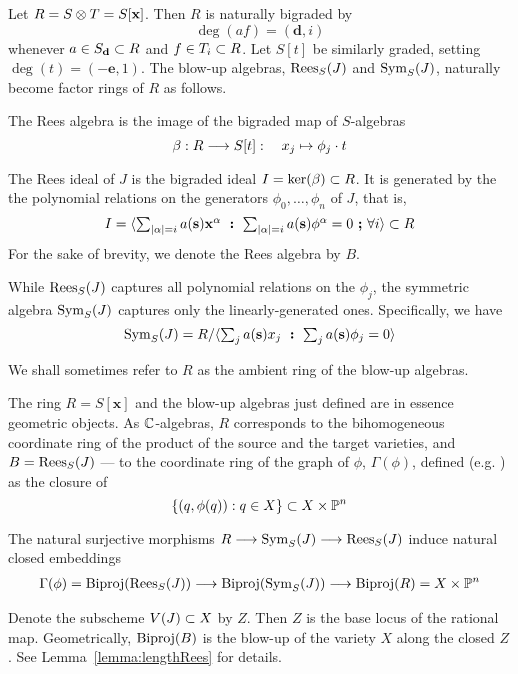 \documentclass[fleqn,reqno]{amsart}
\begin{document}
\begin{paragraf}
\label{par:blowup-algebras}
Let $R=S\otimes T=S[\mathbf x]$. Then $R$ is naturally bigraded by
\[
	\deg(af)=(\mathbf d,i)
\]
whenever $a\in S_{\mathbf d}\subset R$ and $f\in T_i\subset R$.
Let $S[t]$ be similarly graded, setting $\deg(t)=(-\mathbf e,1)$.
The blow-up algebras, $\operatorname{Rees}_S(J)$ and $\operatorname{Sym}_S(J)$, naturally become
factor rings of $R$ as follows.

The Rees algebra is the image of the bigraded map of $S$-algebras
\[
	\beta:R\longrightarrow S[t]:\quad x_j\mapsto\phi_j\cdot t
\]

The Rees ideal of $J$ is the bigraded ideal $I=\ker(\beta)\subset R$.
It is generated by the the polynomial relations on the generators $\phi_0,\ldots,\phi_n$ of $J$,
that is,
\[
	I=\langle \textstyle\sum_{|\alpha|=i} a(\mathbf s){\mathbf x}^{\alpha}
	~\boldsymbol:~
	\textstyle\sum_{|\alpha|=i} a(\mathbf s){\mathbf \phi}^{\alpha}=0
	~\boldsymbol;~\forall i\rangle\subset R
\]
For the sake of brevity, we denote the Rees algebra by $B$.

While $\operatorname{Rees}_S(J)$ captures all polynomial relations on the $\phi_j$,
the symmetric algebra $\operatorname{Sym}_S(J)$ captures only the linearly-generated ones.
Specifically, we have
\[
	\operatorname{Sym}_S(J)=R/\langle \textstyle\sum_j a(\mathbf s)x_j
	~\boldsymbol:~
	\textstyle\sum_j a(\mathbf s)\phi_j=0
	\rangle
\]

We shall sometimes refer to $R$ as the ambient ring of the blow-up algebras.
\end{paragraf}

\begin{paragraf}
\label{par:the-graph}
The ring $R=S[\mathbf x]$ and the blow-up algebras just defined are in essence geometric objects.
As $\mathbb{C}$-algebras, $R$ corresponds to the bihomogeneous coordinate ring of the product of
the source and the target varieties,
and $B=\operatorname{Rees}_S(J)$ --- to the coordinate ring of the graph of $\phi$, $\Gamma(\phi)$,
defined (e.g. \citet{Har92}) as the closure of
\[
	\{(q,\phi(q)):q\in X\}\subset X\times \mathbb{P}^n
\]

The natural surjective morphisms $R\longrightarrow \operatorname{Sym}_S(J)\longrightarrow \operatorname{Rees}_S(J)$ induce natural closed embeddings
\begin{align}
\label{eq:R-Sym-B}
\Gamma(\phi)=\operatorname{Biproj}(\operatorname{Rees}_S(J))\longrightarrow \operatorname{Biproj}(\operatorname{Sym}_S(J))\longrightarrow \operatorname{Biproj}(R)=X\times \mathbb{P}^n
\end{align}
\end{paragraf}

\begin{paragraf}
\label{par:base-locus}
Denote the subscheme $V(J)\subset X$ by $Z$.
Then $Z$ is the base locus of the rational map.
Geometrically, $\operatorname{Biproj}(B)$ is the blow-up of the variety $X$ along the closed $Z$.
See Lemma~\ref{lemma:lengthRees} for details.
\end{paragraf}
\end{document}
